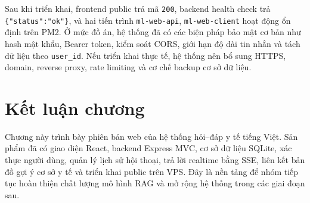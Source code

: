 Sau khi triển khai, frontend public trả mã \texttt{200}, backend health check trả \texttt{\{"status":"ok"\}}, và hai tiến trình \texttt{ml-web-api}, \texttt{ml-web-client} hoạt động ổn định trên PM2. Ở mức đồ án, hệ thống đã có các biện pháp bảo mật cơ bản như hash mật khẩu, Bearer token, kiểm soát CORS, giới hạn độ dài tin nhắn và tách dữ liệu theo \texttt{user\_id}. Nếu triển khai thực tế, hệ thống nên bổ sung HTTPS, domain, reverse proxy, rate limiting và cơ chế backup cơ sở dữ liệu.

\section{Kết luận chương}
Chương này trình bày phiên bản web của hệ thống hỏi--đáp y tế tiếng Việt. Sản phẩm đã có giao diện React, backend Express MVC, cơ sở dữ liệu SQLite, xác thực người dùng, quản lý lịch sử hội thoại, trả lời realtime bằng SSE, liên kết bản đồ gợi ý cơ sở y tế và triển khai public trên VPS. Đây là nền tảng để nhóm tiếp tục hoàn thiện chất lượng mô hình RAG và mở rộng hệ thống trong các giai đoạn sau.
